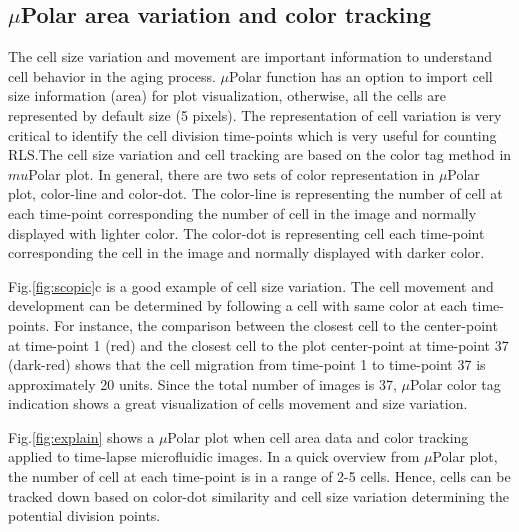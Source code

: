 \documentclass[conference]{IEEEtran}
\begin{document}
\subsection{$\mu$Polar area variation and color tracking }
The cell size variation and movement are important information to understand cell behavior in the aging process. $\mu$Polar function has an option to import cell size information (area) for plot visualization, otherwise, all the cells are represented by default size (5 pixels). The representation of cell variation is very critical to identify the cell division time-points which is very useful for counting RLS.The cell size variation and cell tracking are based on the color tag method in $mu$Polar plot. In general, there are two sets of color representation in $\mu$Polar plot, color-line and color-dot. The color-line is representing the number of cell at each time-point corresponding the number of cell in the image and normally displayed with lighter color. The color-dot is representing cell each time-point corresponding the cell in the image and normally displayed with darker color.

Fig.\ref{fig:scopic}c is a good example of cell size variation. The cell movement and development can be determined by following a cell with same color at each time-points. For instance, the comparison between the closest cell to the center-point at time-point 1 (red) and the closest cell to the plot center-point at time-point 37 (dark-red) shows that the cell migration from time-point 1 to time-point 37 is approximately 20 units. Since the total number of images is 37, $\mu$Polar color tag indication shows a great visualization of cells  movement and size variation. 

Fig.\ref{fig:explain} shows a $\mu$Polar plot when cell area data and color tracking applied to time-lapse microfluidic images. In a quick overview from $\mu$Polar plot,  the number of cell at each time-point is in a range of   2-5 cells. Hence, cells can be tracked down based on color-dot similarity and cell size variation determining the potential division points.
 
\end{document}
